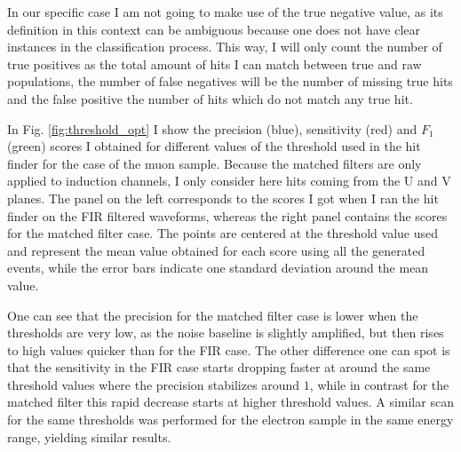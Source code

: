 In our specific case I am not going to make use of the true negative value, as its definition in this context can be ambiguous because one does not have clear instances in the classification process. This way, I will only count the number of true positives as the total amount of hits I can match between true and raw populations, the number of false negatives will be the number of missing true hits and the false positive the number of hits which do not match any true hit.

In Fig. \ref{fig:threshold_opt} I show the precision (blue), sensitivity (red) and $F_{1}$ (green) scores I obtained for different values of the threshold used in the hit finder for the case of the muon sample. Because the matched filters are only applied to induction channels, I only consider here hits coming from the U and V planes. The panel on the left corresponds to the scores I got when I ran the hit finder on the FIR filtered waveforms, whereas the right panel contains the scores for the matched filter case. The points are centered at the threshold value used and represent the mean value obtained for each score using all the generated events, while the error bars indicate one standard deviation around the mean value.

One can see that the precision for the matched filter case is lower when the thresholds are very low, as the noise baseline is slightly amplified, but then rises to high values quicker than for the FIR case. The other difference one can spot is that the sensitivity in the FIR case starts dropping faster at around the same threshold values where the precision stabilizes around $1$, while in contrast for the matched filter this rapid decrease starts at higher threshold values. A similar scan for the same thresholds was performed for the electron sample in the same energy range, yielding similar results.


